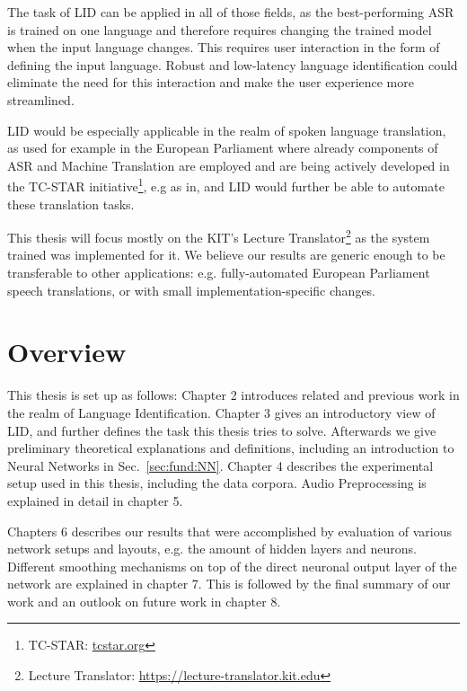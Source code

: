 The task of LID can be applied in all of those fields, as the best-performing ASR is trained on one language and therefore requires changing the trained model when the input language changes. This requires user interaction in the form of defining the input language. Robust and low-latency language identification could eliminate the need for this interaction and make the user experience more streamlined.

LID would be especially applicable in the realm of spoken language translation, as used for example in the European Parliament where already components of ASR and Machine Translation are employed and are being actively developed in the TC-STAR initiative\footnote{TC-STAR: \url{tcstar.org}}, e.g as in\cite{vilar2005statistical}, and LID would further be able to automate these translation tasks.

This thesis will focus mostly on the KIT's Lecture Translator\footnote{Lecture Translator: \url{https://lecture-translator.kit.edu}}  as the system trained was implemented for it. We believe our results are generic enough to be transferable to other applications: e.g. fully-automated European Parliament speech translations, or  with small implementation-specific changes.

\section{Overview}
\label{sec:Intro:Overview}

This thesis is set up as follows: Chapter 2 introduces related and previous work in the realm of Language Identification. Chapter 3 gives an introductory view of LID, and further defines the task this thesis tries to solve. Afterwards we give preliminary theoretical explanations and definitions, including an introduction to Neural Networks in Sec.~\ref{sec:fund:NN}. Chapter 4 describes the experimental setup used in this thesis, including the data corpora. Audio Preprocessing is explained in detail in chapter 5.

Chapters 6 describes our results that were accomplished by evaluation of various network setups and layouts, e.g. the amount of hidden layers and neurons. Different smoothing mechanisms on top of the direct neuronal output layer of the network are explained in chapter 7. This is followed by the final summary of our work and an outlook on future work in chapter 8.